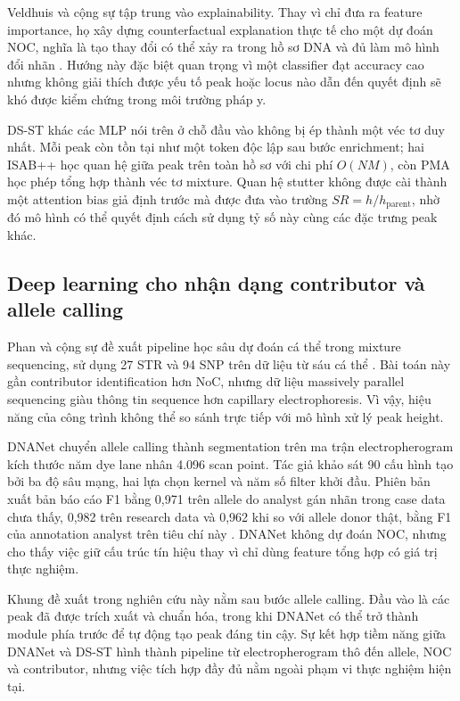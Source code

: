 \documentclass[12pt,a4paper]{article}
\begin{document}
Veldhuis và cộng sự tập trung vào explainability. Thay vì chỉ đưa ra feature importance, họ xây dựng counterfactual explanation thực tế cho một dự đoán NOC, nghĩa là tạo thay đổi có thể xảy ra trong hồ sơ DNA và đủ làm mô hình đổi nhãn \cite{veldhuis2022}. Hướng này đặc biệt quan trọng vì một classifier đạt accuracy cao nhưng không giải thích được yếu tố peak hoặc locus nào dẫn đến quyết định sẽ khó được kiểm chứng trong môi trường pháp y.

DS-ST khác các MLP nói trên ở chỗ đầu vào không bị ép thành một véc tơ duy nhất. Mỗi peak còn tồn tại như một token độc lập sau bước enrichment; hai ISAB++ học quan hệ giữa peak trên toàn hồ sơ với chi phí \(O(NM)\), còn PMA học phép tổng hợp thành véc tơ mixture. Quan hệ stutter không được cài thành một attention bias giả định trước mà được đưa vào trường \(SR=h/h_{\mathrm{parent}}\), nhờ đó mô hình có thể quyết định cách sử dụng tỷ số này cùng các đặc trưng peak khác.

\subsection{Deep learning cho nhận dạng contributor và allele calling}

Phan và cộng sự đề xuất pipeline học sâu dự đoán cá thể trong mixture sequencing, sử dụng 27 STR và 94 SNP trên dữ liệu từ sáu cá thể \cite{phan2021}. Bài toán này gần contributor identification hơn NoC, nhưng dữ liệu massively parallel sequencing giàu thông tin sequence hơn capillary electrophoresis. Vì vậy, hiệu năng của công trình không thể so sánh trực tiếp với mô hình xử lý peak height.

DNANet chuyển allele calling thành segmentation trên ma trận electropherogram kích thước năm dye lane nhân 4.096 scan point. Tác giả khảo sát 90 cấu hình tạo bởi ba độ sâu mạng, hai lựa chọn kernel và năm số filter khởi đầu. Phiên bản xuất bản báo cáo F1 bằng 0,971 trên allele do analyst gán nhãn trong case data chưa thấy, 0,982 trên research data và 0,962 khi so với allele donor thật, bằng F1 của annotation analyst trên tiêu chí này \cite{dewit2025}. DNANet không dự đoán NOC, nhưng cho thấy việc giữ cấu trúc tín hiệu thay vì chỉ dùng feature tổng hợp có giá trị thực nghiệm.

Khung đề xuất trong nghiên cứu này nằm sau bước allele calling. Đầu vào là các peak đã được trích xuất và chuẩn hóa, trong khi DNANet có thể trở thành module phía trước để tự động tạo peak đáng tin cậy. Sự kết hợp tiềm năng giữa DNANet và DS-ST hình thành pipeline từ electropherogram thô đến allele, NOC và contributor, nhưng việc tích hợp đầy đủ nằm ngoài phạm vi thực nghiệm hiện tại.
\end{document}
